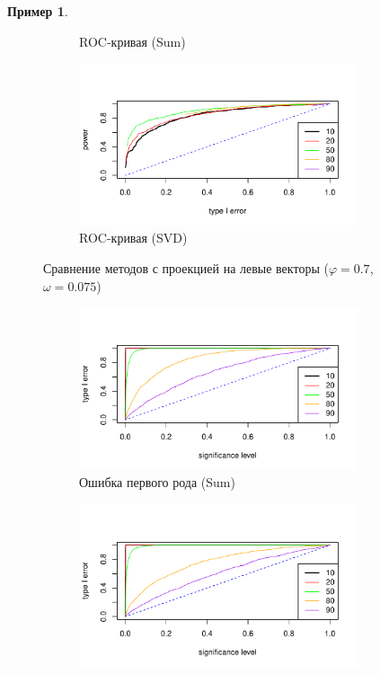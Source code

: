 \documentclass[specialist,
substylefile = spbu_report.rtx,
subf,href,colorlinks=true, 12pt]{disser}
\theoremstyle{definition}
\newtheorem{example}{Пример}
\begin{document}
\begin{example}
\begin{figure}[H]
\begin{subfigure}[t]{0.5\textwidth}
		\caption{ROC-кривая (Sum)}
		\label{fig:sum_ev_r}
	\end{subfigure}\hspace{\fill}
	\begin{subfigure}[t]{0.5\textwidth}
		\centering
		\includegraphics[width=0.9\textwidth]{img/roc_mssa_ev.pdf}
		\caption{ROC-кривая (SVD)}
	\end{subfigure}
	\caption{Сравнение методов с проекцией на левые векторы ($\varphi=0.7$, $\omega=0.075$)}
	\label{fig:sum_ev}
\end{figure}
\begin{figure}[H]
	\captionsetup[subfigure]{justification=Centering}
	\begin{subfigure}[t]{0.5\textwidth}
		\centering
		\includegraphics[width=0.9\textwidth]{img/type1error_sum_fa.pdf}
		\caption{Ошибка первого рода (Sum)}
		\label{fig:sum_fa_a}
	\end{subfigure}\hspace{\fill}
	\begin{subfigure}[t]{0.5\textwidth}
		\centering
		\includegraphics[width=0.9\textwidth]{img/type1error_mssa_fa.pdf}

\end{subfigure}
\end{figure}
\end{example}
\end{document}
